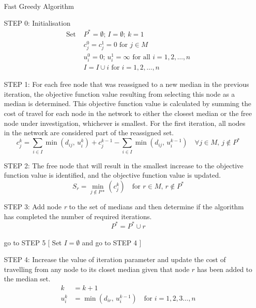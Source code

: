 \documentclass[11pt]{article}
\begin{document}
	\begin{algorithm}
		\caption{Fast Greedy Algorithm}
		\begin{algorithmic}[0]
			
			\Statex
			\Statex STEP 0: Initialisation 	
			\begin{align*}
			\text{Set } & P^{*} = \emptyset \text{; } I = \emptyset \text{; } k = 1\\
			& c_j^0=c_j^1 = 0 \text{ for }j\in M\\
			& u_i^0 = 0 \text{; } u_i^1 = \infty\text{ for all } i=1,2,\dots,n\\
			& I=I\cup i \text{ for } i=1,2,\dots,n
			\end{align*}
			
			\Statex
			\Statex STEP 1: For each free node that was reassigned to a new median in the previous iteration, the objective function value resulting from selecting this node as a median is determined.  This objective function value is calculated by summing the cost of travel for each node in the network to either the closest median or the free node under investigation, whichever is smallest.  For the first iteration, all nodes in the network are considered part of the reassigned set.
			\begin{equation*}
			c_j^k = \sum_{i\in I}\min(d_{ij} \text{, } u_i^k) + c_j^{k-1} - \sum_{i\in I}\min(d_{ij} \text{, } u_i^{k-1})\quad \forall j \in M \text{, } j \notin P^*
			\end{equation*}
			
			\Statex
			\Statex STEP 2: The free node that will result in the smallest increase to the objective function value is identified, and the objective function value is updated.
			\begin{equation*}
			S_r = \min_{j \notin P*}(c_j^k) \quad \text{for } r \in M \text{, } r \notin P^*
			\end{equation*}
			
			\Statex
			\Statex STEP 3: Add node \emph{r} to the set of medians and then determine if the algorithm has completed the number of required iterations.
			\begin{equation*}
			P^* = P^* \cup r
			\end{equation*}\\
			
			\Statex go to STEP 5
			[
			\Else
			\Statex Set $I = \emptyset$ and go to STEP 4
			]
			\EndIf
			
					
			\Statex
			\Statex STEP 4: Increase the value of iteration parameter and update the cost of travelling from any node to its closet median given that node $r$ has been added to the median set.
			\begin{align*}
			k &= k+1\\
			u_i^k &= \min(d_{ir} \text{, } u_i^{k-1}) \quad \text{for } i = 1,2,3 \dots,n\\
			\end{align*}
			

\end{algorithmic}
\end{algorithm}
\end{document}
